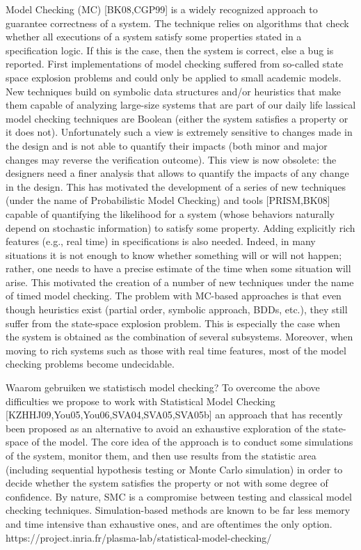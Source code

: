 Model Checking (MC) [BK08,CGP99] is a widely recognized approach to guarantee correctness of a system. The technique relies on algorithms that check whether all executions of a system satisfy some properties stated in a specification logic. If this is the case, then the system is correct, else a bug is reported.
First implementations of model checking suffered from so-called state space explosion problems and could only be applied to small academic models. New techniques build on symbolic data structures and/or heuristics that make them capable of analyzing large-size systems that are part of our daily life
lassical model checking techniques are Boolean (either the system satisfies a property or it does not). Unfortunately such a view is extremely sensitive to changes made in the design and is not able to quantify their impacts (both minor and major changes may reverse the verification outcome).  This view is now obsolete: the designers need a finer analysis that allows to quantify the impacts of any change in the design. This has motivated the development of a series of new techniques (under the name of Probabilistic Model Checking) and tools [PRISM,BK08] capable of quantifying the likelihood for a system (whose behaviors naturally depend on stochastic information) to satisfy some property.  Adding explicitly rich features (e.g., real time) in specifications is also needed. Indeed, in many situations it is not enough to know whether something will or will not happen; rather, one needs to have a precise estimate of the time when some situation will arise. This motivated the creation of a number of new techniques under the name of timed model checking. 
The problem with MC-based approaches is that even though heuristics exist (partial order, symbolic approach, BDDs, etc.), they still suffer from the state-space explosion problem. This is especially the case when the system is obtained as the combination of several subsystems. Moreover, when moving to rich systems such as those with real time features, most of the model checking problems become undecidable.

 \cite{inriaStatsMoodCheck}
 \cite{ buddeModelChecker}
 \cite{AGHASuervey }
 

Waarom gebruiken we statistisch model checking?
To overcome the above difficulties we propose to work with Statistical Model Checking [KZHHJ09,You05,You06,SVA04,SVA05,SVA05b] an approach that has recently been proposed as an alternative to avoid an exhaustive exploration of the state-space of the model. The core idea of the approach is to conduct some simulations of the system, monitor them, and then use results from the statistic area (including sequential hypothesis testing or Monte Carlo simulation) in order to decide whether the system satisfies the property or not with some degree of confidence. By nature, SMC is a compromise between testing and classical model checking techniques. Simulation-based methods are known to be far less memory and time intensive than exhaustive ones, and are oftentimes the only option. 
https://project.inria.fr/plasma-lab/statistical-model-checking/

